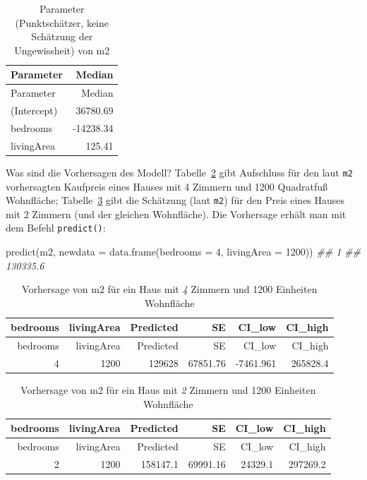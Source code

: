 \documentclass[
  a4paper,
  DIV=11]{scrreprt}
\newenvironment{Shaded}{\begin{snugshade}}{\end{snugshade}}
\newcommand{\AttributeTok}[1]{\textcolor[rgb]{0.40,0.45,0.13}{#1}}
\newcommand{\DecValTok}[1]{\textcolor[rgb]{0.68,0.00,0.00}{#1}}
\newcommand{\DocumentationTok}[1]{\textcolor[rgb]{0.37,0.37,0.37}{\textit{#1}}}
\newcommand{\FunctionTok}[1]{\textcolor[rgb]{0.28,0.35,0.67}{#1}}
\newcommand{\NormalTok}[1]{\textcolor[rgb]{0.00,0.23,0.31}{#1}}
\theoremstyle{definition}
\theoremstyle{remark}
\begin{document}
\hypertarget{tbl-m2}{}
\begin{longtable}[]{@{}lr@{}}
\caption{\label{tbl-m2}Parameter (Punktschätzer, keine Schätzung der
Ungewissheit) von m2}\tabularnewline
\toprule()
Parameter & Median \\
\midrule()
\endfirsthead
\toprule()
Parameter & Median \\
\midrule()
\endhead
(Intercept) & 36780.69 \\
bedrooms & -14238.34 \\
livingArea & 125.41 \\
\bottomrule()
\end{longtable}

Was sind die Vorhersagen des Modell? Tabelle~\ref{tbl-m2-pred} gibt
Aufschluss für den laut \texttt{m2} vorhersagten Kaufpreis eines Hauses
mit 4 Zimmern und 1200 Quadratfuß Wohnfläche; Tabelle~\ref{tbl-m2-pred2}
gibt die Schätzung (laut \texttt{m2}) für den Preis eines Hauses mit 2
Zimmern (und der gleichen Wohnfläche). Die Vorhersage erhält man mit dem
Befehl \texttt{predict()}:

\begin{Shaded}
\begin{Highlighting}[]
\FunctionTok{predict}\NormalTok{(m2, }\AttributeTok{newdata =} \FunctionTok{data.frame}\NormalTok{(}\AttributeTok{bedrooms =} \DecValTok{4}\NormalTok{, }\AttributeTok{livingArea =} \DecValTok{1200}\NormalTok{))}
\DocumentationTok{\#\#        1 }
\DocumentationTok{\#\# 130335.6}
\end{Highlighting}
\end{Shaded}

\hypertarget{tbl-m2-pred}{}
\begin{longtable}[]{@{}rrrrrr@{}}
\caption{\label{tbl-m2-pred}Vorhersage von m2 für ein Haus mit \emph{4}
Zimmern und 1200 Einheiten Wohnfläche}\tabularnewline
\toprule()
bedrooms & livingArea & Predicted & SE & CI\_low & CI\_high \\
\midrule()
\endfirsthead
\toprule()
bedrooms & livingArea & Predicted & SE & CI\_low & CI\_high \\
\midrule()
\endhead
4 & 1200 & 129628 & 67851.76 & -7461.961 & 265828.4 \\
\bottomrule()
\end{longtable}

\hypertarget{tbl-m2-pred2}{}
\begin{longtable}[]{@{}rrrrrr@{}}
\caption{\label{tbl-m2-pred2}Vorhersage von m2 für ein Haus mit \emph{2}
Zimmern und 1200 Einheiten Wohnfläche}\tabularnewline
\toprule()
bedrooms & livingArea & Predicted & SE & CI\_low & CI\_high \\
\midrule()
\endfirsthead
\toprule()
bedrooms & livingArea & Predicted & SE & CI\_low & CI\_high \\
\midrule()
\endhead
2 & 1200 & 158147.1 & 69991.16 & 24329.1 & 297269.2 \\
\bottomrule()
\end{longtable}
\end{document}
